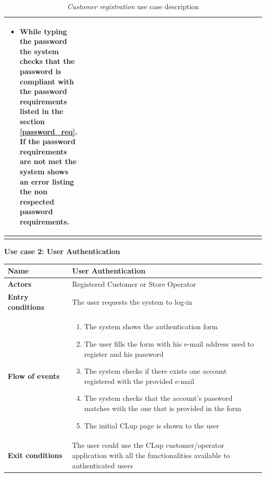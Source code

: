 \begin{longtable}{p{0.25\linewidth}p{0.75\linewidth}}
\begin{itemize}
        \item While typing the password the system checks that the password is compliant with the password requirements listed in the section \ref{password_req}. If the password requirements are not met the system shows an error listing the non respected password requirements.
    \end{itemize}                                                                                                                                     \\
    \bottomrule
    \caption{\emph{Customer registration} use case description}
\end{longtable}


\clearpage
\textbf{Use case 2: User Authentication}
\smallskip
{}
\begin{longtable}{p{0.25\linewidth}p{0.75\linewidth}}
    \toprule
    \textbf{Name}             & \textbf{User Authentication}                                                                                            \\
    \midrule
    \textbf{Actors}           & Registered Customer or Store Operator                                                                                   \\
    \midrule
    \textbf{Entry conditions} & The user requests the system to log-in                                                                                  \\
    \midrule
    \textbf{Flow of events}   &
    \begin{enumerate}
        \item The system shows the authentication form
        \item The user fills the form with his e-mail address used to register and his password
        \item The system checks if there exists one account registered with the provided e-mail
        \item The system checks that the account's password matches with the one that is provided in the form
        \item The initial CLup page is shown to the user
    \end{enumerate}                                                                                                                           \\
    \midrule
    \textbf{Exit conditions}  & The user could use the CLup customer/operator application with all the functionalities available to authenticated users \\

\end{longtable}
